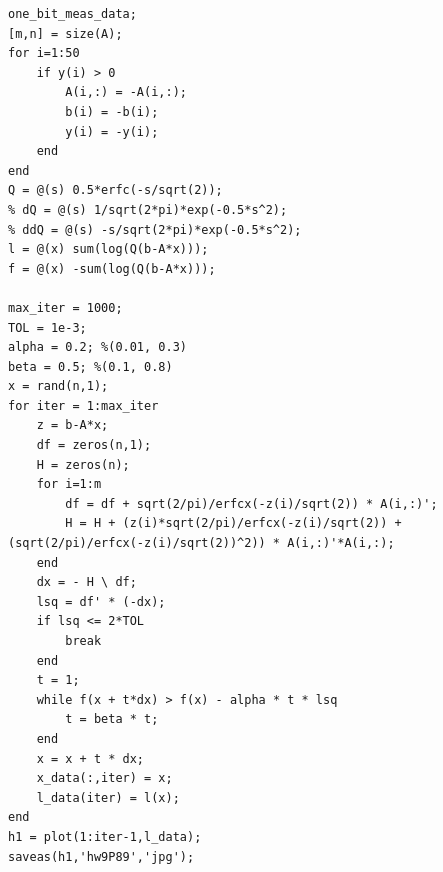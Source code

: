 \documentclass[12pt,a4paper]{article}
\begin{document}
\begin{verbatim}
one_bit_meas_data;
[m,n] = size(A);
for i=1:50
    if y(i) > 0
        A(i,:) = -A(i,:);
        b(i) = -b(i);
        y(i) = -y(i);
    end
end
Q = @(s) 0.5*erfc(-s/sqrt(2));
% dQ = @(s) 1/sqrt(2*pi)*exp(-0.5*s^2);
% ddQ = @(s) -s/sqrt(2*pi)*exp(-0.5*s^2);
l = @(x) sum(log(Q(b-A*x)));
f = @(x) -sum(log(Q(b-A*x)));

max_iter = 1000;
TOL = 1e-3;
alpha = 0.2; %(0.01, 0.3)
beta = 0.5; %(0.1, 0.8)
x = rand(n,1);
for iter = 1:max_iter
    z = b-A*x;
    df = zeros(n,1);
    H = zeros(n);
    for i=1:m
        df = df + sqrt(2/pi)/erfcx(-z(i)/sqrt(2)) * A(i,:)';
        H = H + (z(i)*sqrt(2/pi)/erfcx(-z(i)/sqrt(2)) + (sqrt(2/pi)/erfcx(-z(i)/sqrt(2))^2)) * A(i,:)'*A(i,:);
    end
    dx = - H \ df;
    lsq = df' * (-dx);
    if lsq <= 2*TOL
        break
    end
    t = 1;
    while f(x + t*dx) > f(x) - alpha * t * lsq
        t = beta * t;
    end
    x = x + t * dx;
    x_data(:,iter) = x;
    l_data(iter) = l(x);
end
h1 = plot(1:iter-1,l_data);
saveas(h1,'hw9P89','jpg');
\end{verbatim}
\end{document}
